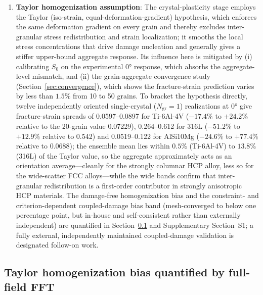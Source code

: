 \begin{enumerate}
    \item \textbf{Taylor homogenization assumption}: The crystal-plasticity stage employs the Taylor (iso-strain, equal-deformation-gradient) hypothesis, which enforces the same deformation gradient on every grain and thereby excludes inter-granular stress redistribution and strain localization; it smooths the local stress concentrations that drive damage nucleation and generally gives a stiffer upper-bound aggregate response. Its influence here is mitigated by (i) calibrating $S_0$ on the experimental $\ang{0}$ response, which absorbs the aggregate-level mismatch, and (ii) the grain-aggregate convergence study (Section~\ref{sec:convergence}), which shows the fracture-strain prediction varies by less than $1.5\%$ from 10 to 50 grains. To bracket the hypothesis directly, twelve independently oriented single-crystal ($N_{\mathrm{gr}}=1$) realizations at $\ang{0}$ give fracture-strain spreads of 0.0597--0.0897 for Ti-6Al-4V ($-17.4\%$ to $+24.2\%$ relative to the 20-grain value 0.07229), 0.264--0.612 for 316L ($-51.2\%$ to $+12.9\%$ relative to 0.542) and 0.0519--0.122 for AlSi10Mg ($-24.6\%$ to $+77.4\%$ relative to 0.0688); the ensemble mean lies within $0.5\%$ (Ti-6Al-4V) to $13.8\%$ (316L) of the Taylor value, so the aggregate approximately acts as an orientation average---cleanly for the strongly columnar HCP alloy, less so for the wide-scatter FCC alloys---while the wide bands confirm that inter-granular redistribution is a first-order contributor in strongly anisotropic HCP materials. The damage-free homogenization bias and the constraint- and criterion-dependent coupled-damage bias band (mesh-converged to below one percentage point, but in-house and self-consistent rather than externally independent) are quantified in Section~\ref{sec:damask_fft} and Supplementary Section~S1; a fully external, independently maintained coupled-damage validation is designated follow-on work.
\end{enumerate}


\subsection{Taylor homogenization bias quantified by full-field FFT}
\label{sec:damask_fft}

